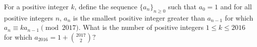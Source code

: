 For a positive integer $k$, define the sequence $\{a_n\}_{n\ge 0}$ such that $a_0=1$ and for all positive integers $n$, $a_n$ is the smallest positive integer greater than $a_{n-1}$ for which $a_n\equiv ka_{n-1}\pmod {2017}$. What is the number of positive integers $1\le k\le 2016$ for which $a_{2016}=1+\binom{2017}{2}?$
